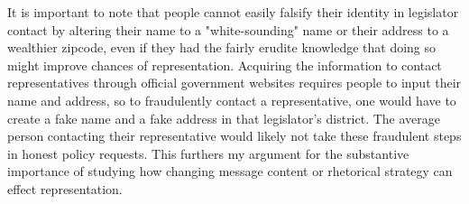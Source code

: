 \documentclass[12pt]{article}
\begin{document}
 It is important to note that people cannot easily falsify their identity in legislator contact by altering their name to a "white-sounding" name or their address to a wealthier zipcode, even if they had the fairly erudite knowledge that doing so might improve chances of representation. Acquiring the information to contact representatives through official government websites requires people to input their name and address, so to fraudulently contact a representative, one would have to create a fake name and a fake address in that legislator's district. The average person contacting their representative would likely not take these fraudulent steps in honest policy requests. This furthers my argument for the substantive importance of studying how changing message content or rhetorical strategy can effect representation.

\end{document}
